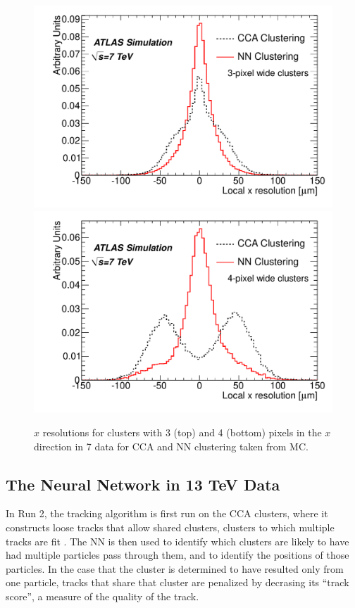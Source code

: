 \begin{centering}
\begin{figure}[bth]
\myfloatalign
\includegraphics[width=.9\linewidth]{figures/nn/3x_res.pdf}
\includegraphics[width=.9\linewidth]{figures/nn/4x_res.pdf}
\caption{$x$ resolutions for clusters with 3 (top) and 4 (bottom) pixels in the $x$ direction in 7 \tev data for \ac{CCA} and \ac{NN} clustering taken from \ac{MC}.}
\label{fig:7tev_res}
\end{figure}
\end{centering}

\subsection{The Neural Network in 13 TeV Data}

In Run 2, the tracking algorithm is first run on the \ac{CCA} clusters, where it constructs loose tracks that allow shared clusters, clusters to which multiple tracks are fit \cite{ATL-PHYS-PUB-2015-044}. The \ac{NN} is then used to identify which clusters are likely to have had multiple particles pass through them, and to identify the positions of those particles. In the case that the cluster is determined to have resulted only from one particle, tracks that share that cluster are penalized by decrasing its ``track score'', a measure of the quality of the track. 

